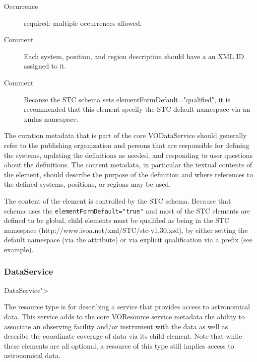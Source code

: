 \documentclass[11pt,a4paper]{ivoa}
\begin{document}
\begin{generated}
\begin{bigdescription}
\begin{description}
\item[Occurrence] required; multiple occurrences allowed.
\item[Comment] 
                       Each system, position, and region description
                       should have a an XML ID assigned to it.
                     
\item[Comment] 
                       Because the STC schema sets 
                       elementFormDefault={"}qualified{"}, it is
                       recommended that this element specify the STC 
                       default namespace via an xmlns namespace.
                     

\end{description}


\end{bigdescription}\endgroup

\endgroup
\end{generated}



The curation metadata that is part of the core VODataService should
generally refer to the publishing organization and persons that are
responsible for defining the systems, updating the definitions as
needed, and responding to user questions about the definitions.  The
content metadata, in particular the textual contents of the
 element, should describe the purpose
of the definition and where references to the defined systems,
positions, or regions may be used.  


The content of the  element is
controlled by the STC schema.  Because that schema uses the 
\verb|elementFormDefault="true"| and most of the STC elements
are defined to be global,
 child elements must be qualified
as being in the STC namespace
(http://www.ivoa.net/xml/STC/stc-v1.30.xsd), by either setting the 
default namespace (via the  attribute) or via
explicit qualification via a prefix (see example).  


\subsubsection{DataService}
DataService">


The  resource type is for describing a
service that provides access to astronomical data.  This service adds
to the core VOResource service metadata the ability to associate an
observing facility and/or instrument with the data as well as describe
the coordinate coverage of data via its child 
element.  Note that while these elements are all optional, a resource
of this type still implies access to astronomical data.
\end{document}
